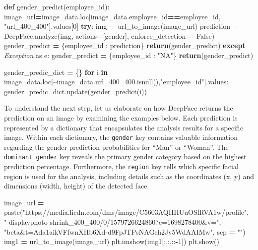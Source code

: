 \documentclass[11pt,]{article}
\newenvironment{Shaded}{\begin{snugshade}}{\end{snugshade}}
\newcommand{\ControlFlowTok}[1]{\textcolor[rgb]{0.13,0.29,0.53}{\textbf{#1}}}
\newcommand{\DecValTok}[1]{\textcolor[rgb]{0.00,0.00,0.81}{#1}}
\newcommand{\ImportTok}[1]{#1}
\newcommand{\KeywordTok}[1]{\textcolor[rgb]{0.13,0.29,0.53}{\textbf{#1}}}
\newcommand{\NormalTok}[1]{#1}
\newcommand{\OperatorTok}[1]{\textcolor[rgb]{0.81,0.36,0.00}{\textbf{#1}}}
\newcommand{\PreprocessorTok}[1]{\textcolor[rgb]{0.56,0.35,0.01}{\textit{#1}}}
\newcommand{\StringTok}[1]{\textcolor[rgb]{0.31,0.60,0.02}{#1}}
\newcommand{\VariableTok}[1]{\textcolor[rgb]{0.00,0.00,0.00}{#1}}
\begin{document}
\begin{Shaded}
\begin{Highlighting}[]
\KeywordTok{def}\NormalTok{ gender\_predict(employee\_id):}
\NormalTok{    image\_url}\OperatorTok{=}\NormalTok{image\_data.loc[image\_data.employee\_id}\OperatorTok{==}\NormalTok{employee\_id,}
                             \StringTok{"url\_400\_400"}\NormalTok{].values[}\DecValTok{0}\NormalTok{]}
    \ControlFlowTok{try}\NormalTok{:}
\NormalTok{        img }\OperatorTok{=}\NormalTok{ url\_to\_image(image\_url)}
\NormalTok{        prediction }\OperatorTok{=}\NormalTok{ DeepFace.analyze(img, actions}\OperatorTok{=}\NormalTok{[}\StringTok{\textquotesingle{}gender\textquotesingle{}}\NormalTok{],}
\NormalTok{                                      enforce\_detection }\OperatorTok{=} \VariableTok{False}\NormalTok{)}
\NormalTok{        gender\_predict }\OperatorTok{=}\NormalTok{ \{employee\_id : prediction\}}
        \ControlFlowTok{return}\NormalTok{(gender\_predict)}
    \ControlFlowTok{except} \PreprocessorTok{Exception} \ImportTok{as}\NormalTok{ e:}
\NormalTok{        gender\_predict }\OperatorTok{=}\NormalTok{ \{employee\_id : }\StringTok{"NA"}\NormalTok{\}}
        \ControlFlowTok{return}\NormalTok{(gender\_predict)}

\NormalTok{gender\_predic\_dict }\OperatorTok{=}\NormalTok{ \{\}}
\ControlFlowTok{for}\NormalTok{ i }\KeywordTok{in}\NormalTok{ image\_data.loc[}\OperatorTok{\textasciitilde{}}\NormalTok{image\_data.url\_400\_400.isnull(),}\StringTok{"employee\_id"}\NormalTok{].values:}
\NormalTok{    gender\_predic\_dict.update(gender\_predict(i))}
\end{Highlighting}
\end{Shaded}

To understand the next step, let us elaborate on how DeepFace returns
the prediction on an image by examining the examples below. Each
prediction is represented by a dictionary that encapsulates the analysis
results for a specific image. Within each dictionary, the
\texttt{gender} key contains valuable information regarding the gender
prediction probabilities for ``Man'' or ``Woman''. The
\texttt{dominant\ gender} key reveals the primary gender category based
on the highest prediction percentage. Furthermore, the \texttt{region}
key tells which specific facial region is used for the analysis,
including details such as the coordinates (x, y) and dimensions (width,
height) of the detected face.

\begin{Shaded}
\begin{Highlighting}[]
\NormalTok{image\_url }\OperatorTok{=}\NormalTok{ paste(}\StringTok{"https://media.licdn.com/dms/image/C5603AQHHUuOSlRVA1w/profile"}\NormalTok{,}
                  \StringTok{"{-}displayphoto{-}shrink\_400\_400/0/1579726624860?e=1698278400\&v="}\NormalTok{,}
                  \StringTok{"beta\&t=Ada1aikVFfwnXHb6Xd{-}d9FpJTPsNAGch2Jv5WdAAIMw"}\NormalTok{, sep }\OperatorTok{=} \StringTok{""}\NormalTok{)}
\NormalTok{img1 }\OperatorTok{=}\NormalTok{ url\_to\_image(image\_url)}
\NormalTok{plt.imshow(img1[:,:,::}\OperatorTok{{-}}\DecValTok{1}\NormalTok{])}
\NormalTok{plt.show()}
\end{Highlighting}
\end{Shaded}
\end{document}

